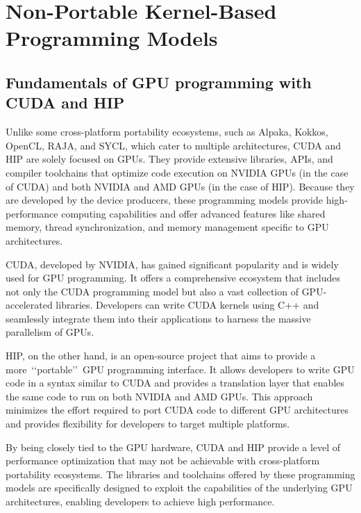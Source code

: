 \section{Non-Portable Kernel-Based Programming Models}\label{sec:non-portable-kernel-based-programming-models}


\subsection{Fundamentals of GPU programming with CUDA and HIP}


\par
Unlike some cross-platform portability ecosystems, such as Alpaka, Kokkos, OpenCL, RAJA, and SYCL, which cater to multiple architectures, CUDA and HIP are solely focused on GPUs.
They provide extensive libraries, APIs, and compiler toolchains that optimize code execution on NVIDIA GPUs (in the case of CUDA) and both NVIDIA and AMD GPUs (in the case of HIP).
Because they are developed by the device producers, these programming models provide high-performance computing capabilities and offer advanced features like shared memory, thread synchronization, and memory management specific to GPU architectures.


\par
CUDA, developed by NVIDIA, has gained significant popularity and is widely used for GPU programming.
It offers a comprehensive ecosystem that includes not only the CUDA programming model but also a vast collection of GPU-accelerated libraries.
Developers can write CUDA kernels using C++ and seamlessly integrate them into their applications to harness the massive parallelism of GPUs.


\par
HIP, on the other hand, is an open-source project that aims to provide a more~\lq\lq portable\rq\rq~GPU programming interface.
It allows developers to write GPU code in a syntax similar to CUDA and provides a translation layer that enables the same code to run on both NVIDIA and AMD GPUs.
This approach minimizes the effort required to port CUDA code to different GPU architectures and provides flexibility for developers to target multiple platforms.


\par
By being closely tied to the GPU hardware, CUDA and HIP provide a level of performance optimization that may not be achievable with cross-platform portability ecosystems.
The libraries and toolchains offered by these programming models are specifically designed to exploit the capabilities of the underlying GPU architectures, enabling developers to achieve high performance.


